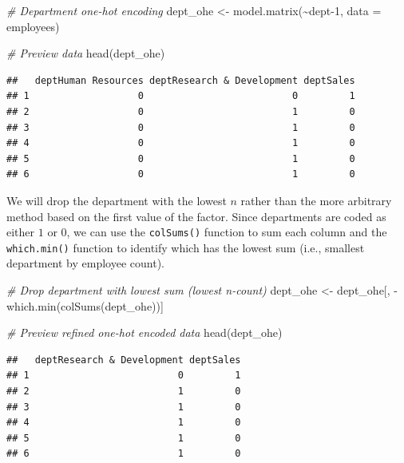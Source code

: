 \documentclass[
]{book}
\newenvironment{Shaded}{\begin{snugshade}}{\end{snugshade}}
\newcommand{\AttributeTok}[1]{\textcolor[rgb]{0.77,0.63,0.00}{#1}}
\newcommand{\CommentTok}[1]{\textcolor[rgb]{0.56,0.35,0.01}{\textit{#1}}}
\newcommand{\DecValTok}[1]{\textcolor[rgb]{0.00,0.00,0.81}{#1}}
\newcommand{\FunctionTok}[1]{\textcolor[rgb]{0.00,0.00,0.00}{#1}}
\newcommand{\NormalTok}[1]{#1}
\newcommand{\OtherTok}[1]{\textcolor[rgb]{0.56,0.35,0.01}{#1}}
\newcommand{\SpecialCharTok}[1]{\textcolor[rgb]{0.00,0.00,0.00}{#1}}
\begin{document}
\begin{Shaded}
\begin{Highlighting}[]
\CommentTok{\# Department one{-}hot encoding}
\NormalTok{dept\_ohe }\OtherTok{\textless{}{-}} \FunctionTok{model.matrix}\NormalTok{(}\SpecialCharTok{\textasciitilde{}}\NormalTok{dept}\DecValTok{{-}1}\NormalTok{, }\AttributeTok{data =}\NormalTok{ employees)}

\CommentTok{\# Preview data}
\FunctionTok{head}\NormalTok{(dept\_ohe)}
\end{Highlighting}
\end{Shaded}

\begin{verbatim}
##   deptHuman Resources deptResearch & Development deptSales
## 1                   0                          0         1
## 2                   0                          1         0
## 3                   0                          1         0
## 4                   0                          1         0
## 5                   0                          1         0
## 6                   0                          1         0
\end{verbatim}

We will drop the department with the lowest \(n\) rather than the more arbitrary method based on the first value of the factor. Since departments are coded as either \(1\) or \(0\), we can use the \texttt{colSums()} function to sum each column and the \texttt{which.min()} function to identify which has the lowest sum (i.e., smallest department by employee count).

\begin{Shaded}
\begin{Highlighting}[]
\CommentTok{\# Drop department with lowest sum (lowest n{-}count)}
\NormalTok{dept\_ohe }\OtherTok{\textless{}{-}}\NormalTok{ dept\_ohe[, }\SpecialCharTok{{-}}\FunctionTok{which.min}\NormalTok{(}\FunctionTok{colSums}\NormalTok{(dept\_ohe))]}

\CommentTok{\# Preview refined one{-}hot encoded data}
\FunctionTok{head}\NormalTok{(dept\_ohe)}
\end{Highlighting}
\end{Shaded}

\begin{verbatim}
##   deptResearch & Development deptSales
## 1                          0         1
## 2                          1         0
## 3                          1         0
## 4                          1         0
## 5                          1         0
## 6                          1         0
\end{verbatim}
\end{document}
